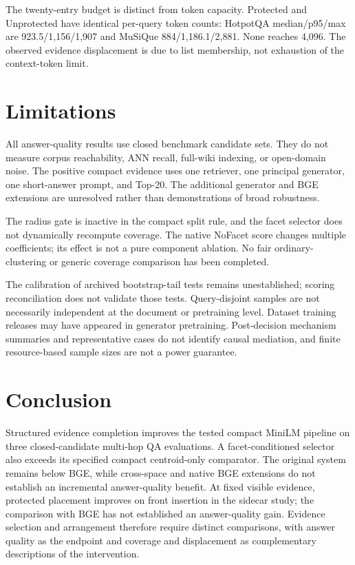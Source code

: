 \documentclass[11pt]{article}
\begin{document}
The twenty-entry budget is distinct from token capacity. Protected and
Unprotected have identical per-query token counts: HotpotQA median/p95/max
are 923.5/1,156/1,907 and MuSiQue 884/1,186.1/2,881. None reaches 4,096.
The observed evidence displacement is due to list membership, not exhaustion
of the context-token limit.

\section{Limitations}
All answer-quality results use closed benchmark candidate sets. They do not
measure corpus reachability, ANN recall, full-wiki indexing, or open-domain
noise. The positive compact evidence uses one retriever, one principal
generator, one short-answer prompt, and Top-20. The additional generator and
BGE extensions are unresolved rather than demonstrations of broad robustness.

The radius gate is inactive in the compact split rule, and the
facet selector does not dynamically recompute coverage.
The native NoFacet score changes multiple coefficients; its effect is
not a pure component ablation. No fair ordinary-clustering or generic
coverage comparison has been completed.

The calibration of archived bootstrap-tail tests remains unestablished;
scoring reconciliation does not validate those tests. Query-disjoint samples are not
necessarily independent at the document or pretraining level. Dataset
training releases may have appeared in generator pretraining. Post-decision
mechanism summaries and representative cases do not identify causal
mediation, and finite resource-based sample sizes are not a power guarantee.

\section{Conclusion}
Structured evidence completion improves the tested compact MiniLM pipeline on
three closed-candidate multi-hop QA evaluations. A facet-conditioned selector
also exceeds its specified compact centroid-only comparator. The original
system remains below BGE, while cross-space and native BGE extensions do not
establish an incremental answer-quality benefit. At fixed visible evidence,
protected placement improves on front insertion in the sidecar study;
the comparison with BGE has not established an answer-quality gain.
Evidence selection and arrangement therefore require distinct comparisons,
with answer quality as the endpoint and coverage and displacement as
complementary descriptions of the intervention.
\end{document}
